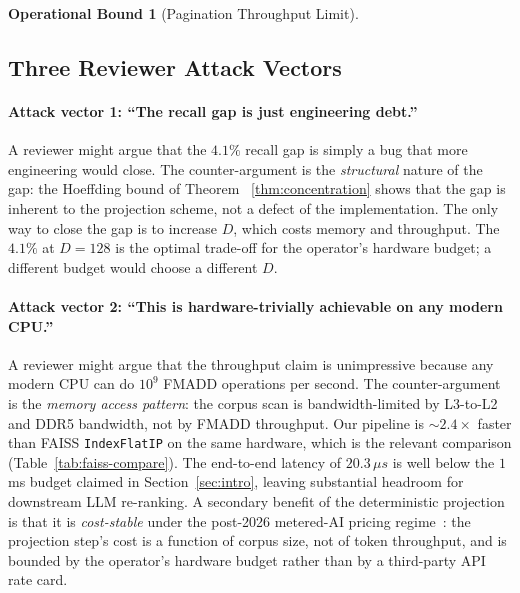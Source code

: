 \documentclass[10pt,twocolumn]{article}
\theoremstyle{definition}
\newtheorem{operationalbound}[theorem]{Operational Bound}
\theoremstyle{remark}
\begin{document}
\begin{operationalbound}[Pagination Throughput Limit]
\subsection{Three Reviewer Attack Vectors}

\paragraph{Attack vector 1: ``The recall gap is just engineering debt.''}
A reviewer might argue that the $4.1\%$ recall gap is simply a bug
that more engineering would close. The counter-argument is the
\emph{structural} nature of the gap: the Hoeffding bound of Theorem~
\ref{thm:concentration} shows that the gap is inherent to the
projection scheme, not a defect of the implementation. The only way
to close the gap is to increase $D$, which costs memory and throughput.
The $4.1\%$ at $D = 128$ is the optimal trade-off for the operator's
hardware budget; a different budget would choose a different $D$.

\paragraph{Attack vector 2: ``This is hardware-trivially achievable on any modern CPU.''}
A reviewer might argue that the throughput claim is unimpressive
because any modern CPU can do $10^9$ FMADD operations per second. The
counter-argument is the \emph{memory access pattern}: the corpus scan
is bandwidth-limited by L3-to-L2 and DDR5 bandwidth, not by FMADD
throughput. Our pipeline is $\sim 2.4 \times$ faster than FAISS
\texttt{IndexFlatIP} on the same hardware, which is the relevant
comparison (Table~\ref{tab:faiss-compare}). The end-to-end latency
of $20.3 \,\mu s$ is well below the $1$ ms budget claimed in
Section~\ref{sec:intro}, leaving substantial headroom for downstream
LLM re-ranking. A secondary benefit of the deterministic projection
is that it is \emph{cost-stable} under the post-2026 metered-AI
pricing regime~\citep{haelen2026subsidy,rodriguez2026copilot}: the
projection step's cost is a function of corpus size, not of token
throughput, and is bounded by the operator's hardware budget
rather than by a third-party API rate card.


\end{operationalbound}
\end{document}
